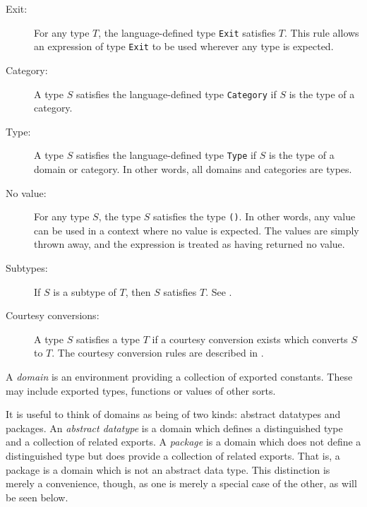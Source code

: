 \begin{description}
\item[Exit:]
For any type $T$, the language-defined type \verb"Exit" satisfies $T$.
This rule allows an expression of type \verb"Exit" to be used wherever
any type is expected.

\item[Category:]
A type $S$ satisfies the language-defined type \verb"Category"
if $S$ is the type of a category.

\item[Type:]
A type $S$ satisfies the language-defined type \verb"Type"
if $S$ is the type of a domain or category.  In other words,
all domains and categories are types.

\item[No value:]
For any type $S$, the type $S$ satisfies the type \verb"()".
In other words, any value can be used in a context where no value
is expected.  The values are simply thrown away, and the expression
is treated as having returned no value.

\item[Subtypes:]
If $S$ is a subtype of $T$, then $S$ satisfies $T$.
See .

\item[Courtesy conversions:]
A type $S$ satisfies a type $T$ if a courtesy conversion exists
which converts $S$ to $T$.  The courtesy conversion rules
are described in .

\end{description}


A {\em domain} is an environment providing a collection of exported constants.
These may include exported types, functions or values of other sorts.

It is useful to think of domains as being of two kinds:
abstract datatypes and packages.
An {\em abstract datatype} is a domain which defines a distinguished type
and a collection of related exports.
A {\em package} is a domain which does not define a distinguished type
but does provide a collection of related exports.  That is, a package
is a domain which is not an abstract data type.
This distinction is merely a convenience, though, as one is merely a special
case of the other, as will be seen below.


